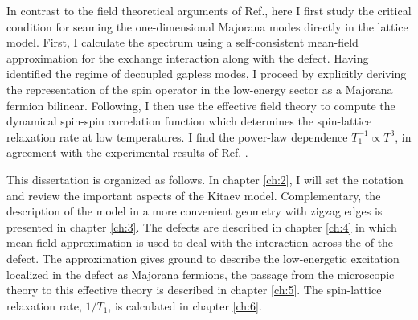 In contrast to the field theoretical arguments of Ref.\cite{Aasen_2020}, here I first study the critical condition for seaming the one-dimensional Majorana modes directly in the lattice model. First, I calculate the spectrum using a self-consistent mean-field approximation for the exchange interaction along with the defect. Having identified the regime of decoupled gapless modes, I proceed by explicitly deriving the representation of the spin operator in the low-energy sector as a Majorana fermion bilinear. Following, I then use the effective field theory to compute the dynamical spin-spin correlation function which determines the spin-lattice relaxation rate at low temperatures. I find the power-law dependence $T_1^{-1} \propto T^3$, in agreement with the experimental results of Ref.  \cite{Zheng-gapless2017}.

This dissertation is organized as follows. In chapter \ref{ch:2}, I will set the notation and review the important aspects of the Kitaev model. Complementary, the description of the model in a more convenient geometry with zigzag edges is presented in chapter \ref{ch:3}. The defects are described %
in chapter \ref{ch:4} in which mean-field approximation  is used to deal with the interaction across the  of the defect. The approximation gives ground to describe the low-energetic excitation localized in the defect as Majorana fermions, the passage from the microscopic theory to this effective theory is described in chapter \ref{ch:5}. The spin-lattice relaxation rate, $1/T_1$, is calculated in chapter \ref{ch:6}.















